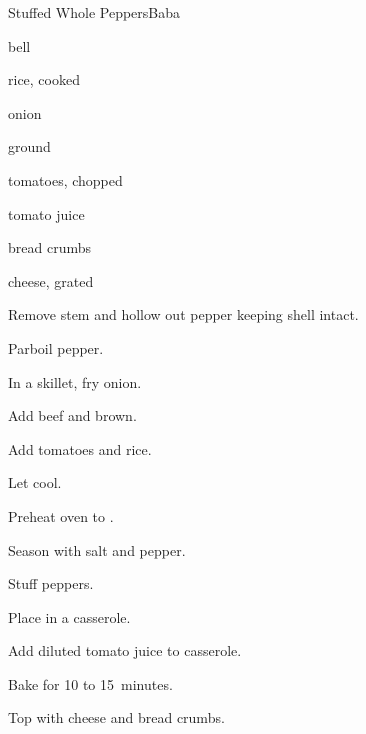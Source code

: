 \begin{recipe}{Stuffed Whole Peppers}{Baba}{}

\begin{ingredients}
\item bell 
\item rice, cooked
\item onion
\item ground 
\item tomatoes, chopped
\item tomato juice
\item bread crumbs
\item cheese, grated
\end{ingredients}

\begin{directions}
\item Remove stem and hollow out pepper keeping shell intact.
\item Parboil pepper.
\item In a skillet, fry onion.
\item Add beef and brown.
\item Add tomatoes and rice.
\item Let cool.
\item Preheat oven to .
\item Season with salt and pepper.
\item Stuff peppers.
\item Place in a casserole.
\item Add diluted tomato juice to casserole.
\item Bake for 10 to 15~minutes.
\item Top with cheese and bread crumbs.
\end{directions}

\end{recipe}
